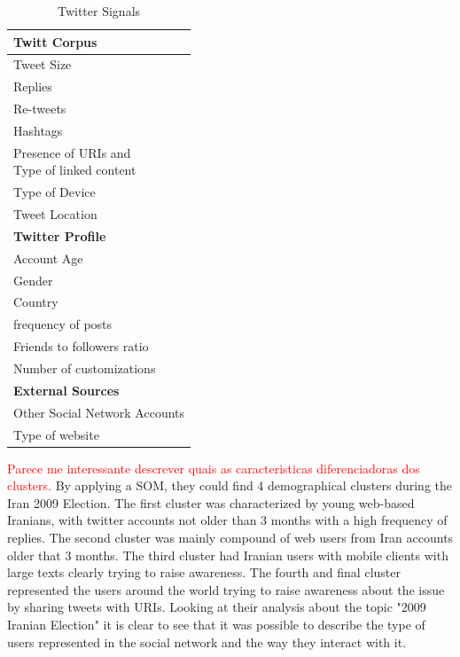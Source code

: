 \begin{table}[H]
  \caption{Twitter Signals}
  \label{tab:twitter_signals}
  \begin{center}
    \begin{tabular}{|l|}
      \hline
      \textbf{Twitt Corpus}  \\
      \hline
      Tweet Size \\
      \hline
      Replies \\
      \hline
      Re-tweets \\
      \hline
      Hashtags  \\
      \hline
      \specialcell{Presence of URIs and \\ Type of linked content} \\
      \hline
      Type of Device   \\
      \hline
      Tweet Location  \\
      \hline                 
      \hline                 
      \textbf{Twitter Profile} \\ 
      \hline
      Account Age   \\
      \hline
      Gender     \\
      \hline
      Country \\    
      \hline
      frequency of posts \\
      \hline
      Friends to followers ratio \\ 
      \hline
      Number of  customizations \\   
      \hline
      \hline
      \textbf{External Sources} \\
      \hline
      Other Social Network Accounts   \\
      \hline
      Type of website\\ 
      \hline
    \end{tabular}
  \end{center}
\end{table}
                                                                                                          \textcolor{red}{Parece me interessante descrever quais as caracteristicas diferenciadoras dos clusters.}
By applying a \ac{SOM}, they could find 4 demographical clusters during the Iran 2009 Election. The first cluster was characterized by young web-based Iranians, with twitter accounts not older than 3 months with a high frequency of replies. The second cluster was mainly compound of web users from Iran accounts older that 3 months. The third cluster had Iranian users with mobile clients with large texts clearly trying to raise awareness. The fourth and final cluster represented the users around the world trying to raise awareness about the issue by sharing tweets with URIs.
Looking at their analysis about the topic "2009 Iranian Election" it is clear to see that it was possible to describe the type of users represented in the social network and the way they interact with it.

